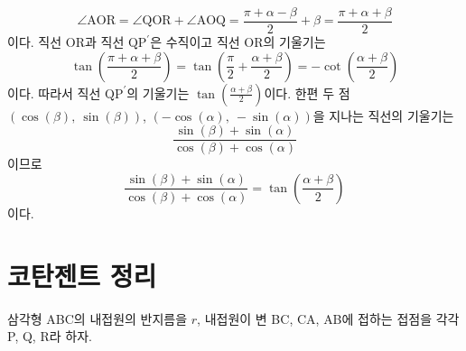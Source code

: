 \documentclass[11pt, a4paper]{book}
\begin{document}
 \[
 \angle \textrm{AOR} =\angle \textrm{QOR} +\angle\textrm{AOQ}= \frac{\pi+\alpha-\beta}{2} +\beta =\frac{\pi+\alpha+\beta}{2}
 \]
 이다. 직선 \textrm{OR}과 직선 $\textrm{QP}^{\prime}$은 수직이고 직선  \textrm{OR}의 기울기는
\[
\tan\left(\frac{\pi+\alpha+\beta}{2}\right) =\tan\left(\frac{\pi}{2}+\frac{\alpha+\beta}{2}\right) = - \cot\left(\frac{\alpha+\beta}{2}\right)
\] 
이다. 따라서 직선 $\textrm{QP}^{\prime}$의 기울기는 $\tan\left(\frac{\alpha+\beta}{2}\right)$이다. 한편 두 점 $\left(\cos(\beta),\: \sin(\beta)\right)$, $\left(-\cos(\alpha),\: -\sin(\alpha)\right)$을 지나는 직선의 기울기는
\[
\frac{\sin(\beta)+\sin(\alpha)}{\cos(\beta)+\cos(\alpha)}
\]
이므로
\begin{equation}\label{eqn:halftan}
\frac{\sin(\beta)+\sin(\alpha)}{\cos(\beta)+\cos(\alpha)}=\tan\left(\frac{\alpha+\beta}{2}\right)
\end{equation}
이다.
\vspace{1em}
\section{코탄젠트 정리}
삼각형 \textrm{ABC}의 내접원의 반지름을 $r$, 내접원이 변 \textrm{BC}, \textrm{CA}, \textrm{AB}에 접하는 접점을 각각 \textrm{P}, \textrm{Q}, \textrm{R}라 하자. 
\end{document}
